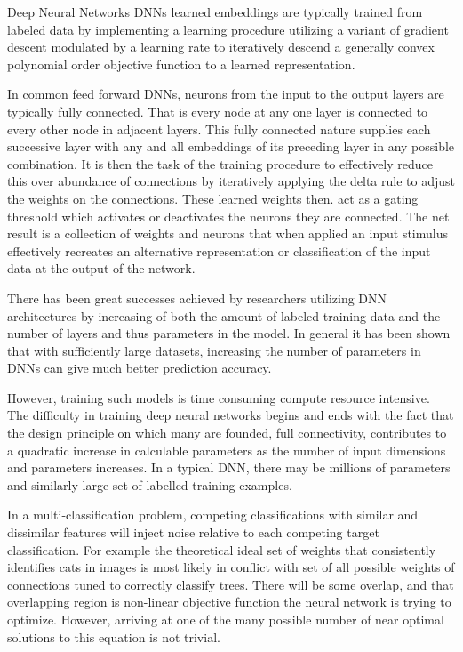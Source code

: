 \documentclass{llncs}
\begin{document}
Deep Neural Networks DNNs learned embeddings are typically trained from labeled data by
implementing a learning procedure utilizing a variant of gradient descent modulated by a
learning rate to iteratively descend a generally convex polynomial order objective
function to a learned representation.

In common feed forward DNNs, neurons from the input to the output layers are typically
fully connected.  That is every node at any one layer is connected to every other node
in adjacent layers.  This fully connected nature supplies each successive layer with any
and all embeddings of its preceding layer in any possible combination. It is then the
task of the training procedure to effectively reduce this over abundance of connections
by iteratively applying the delta rule to adjust the weights on the connections.  These
learned weights then. act as a gating threshold which activates or deactivates the neurons
they are connected.  The net result is a collection of weights and neurons  that when
applied an input stimulus effectively recreates an alternative representation or
classification of the input data at the output of the network.

There has been great successes achieved by researchers utilizing DNN architectures by
increasing of both the amount of labeled training data and the number of layers and
thus parameters in the model.   In general it has been shown that with sufficiently
large datasets, increasing the number of parameters in DNNs can give much better
prediction accuracy.

However, training such models is time consuming compute resource intensive.  The
difficulty in training deep neural networks begins and ends with the fact that the
design principle on which many are founded, full connectivity, contributes to a quadratic
increase in calculable parameters as the number of input dimensions and parameters
increases.  In a typical DNN, there may be millions of parameters and similarly large
set of labelled training examples.

In a multi-classification problem, competing classifications with similar and dissimilar
features will inject noise relative to each competing target classification. For example
the theoretical ideal set of weights that consistently identifies cats in images is most
likely in conflict with set of all possible weights of connections tuned to correctly
classify trees.  There will be some overlap, and that overlapping region is non-linear
objective function the neural network is trying to optimize.  However, arriving at one
of the many possible number of near optimal solutions to this equation is not trivial.
\end{document}
